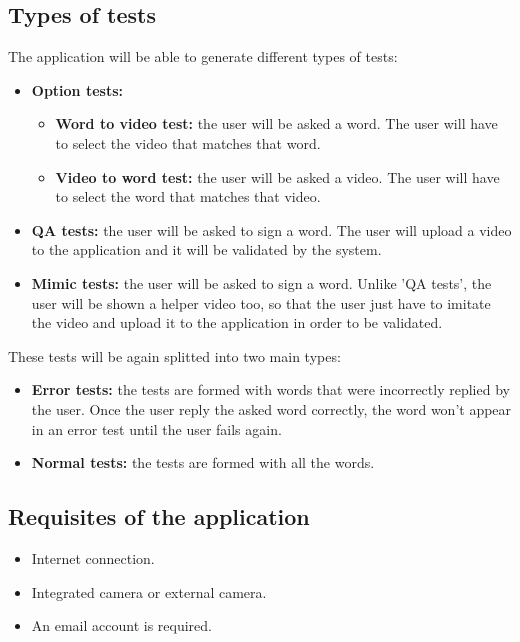 \subsection{Types of tests}
The application will be able to generate different types of tests:
\begin{itemize}[noitemsep]
    \item \textbf{Option tests:}
        \begin{itemize}[noitemsep]
            \item \textbf{Word to video test:} the user will be asked a word. The user will have to select the video that matches that word.
            \item \textbf{Video to word test:} the user will be asked a video. The user will have to select the word that matches that video.
        \end{itemize}
    \item \textbf{QA tests:} the user will be asked to sign a word. The user will upload a video to the application and it will be validated by the system.
    \item \textbf{Mimic tests:} the user will be asked to sign a word. Unlike 'QA tests', the user will be shown a helper video too, so that the user just have to imitate the video and upload it to the application in order to be validated.
\end{itemize}

These tests will be again splitted into two main types:
\begin{itemize}[noitemsep]
    \item \textbf{Error tests:} the tests are formed with words that were incorrectly replied by the user. Once the user reply the asked word correctly, the word won't appear in an error test until the user fails again.
    \item \textbf{Normal tests:} the tests are formed with all the words.
\end{itemize}

\subsection{Requisites of the application}
\begin{itemize}[noitemsep]
    \item Internet connection.
    \item Integrated camera or external camera.
    \item An email account is required.
\end{itemize}


